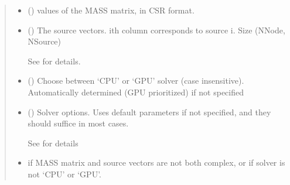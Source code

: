 \documentclass[letterpaper,10pt,english]{sphinxmanual}
\begin{document}
\begin{fulllineitems}
\begin{quote}
\begin{description}
\begin{itemize}
\item {} 
\sphinxAtStartPar
{} () \textendash{} values of the MASS matrix, in CSR format.

\item {} 
\sphinxAtStartPar
{} () \textendash{} 
\sphinxAtStartPar
The source vectors. i\sphinxhyphen{}th column corresponds to source i. Size (NNode, NSource)

\sphinxAtStartPar
See {\hyperref[\detokenize{_autosummary/nirfasterff.math.gen_sources:nirfasterff.math.gen_sources}]{}} for details.


\item {} 
\sphinxAtStartPar
{} (\sphinxstyleliteralemphasis{\sphinxupquote{, }}) \textendash{} Choose between ‘CPU’ or ‘GPU’ solver (case insensitive). Automatically determined (GPU prioritized) if not specified

\item {} 
\sphinxAtStartPar
{} ({\hyperref[\detokenize{_autosummary/nirfasterff.utils.SolverOptions:nirfasterff.utils.SolverOptions}]{}}\sphinxstyleliteralemphasis{\sphinxupquote{, }}) \textendash{} 
\sphinxAtStartPar
Solver options. Uses default parameters if not specified, and they should suffice in most cases.

\sphinxAtStartPar
See {\hyperref[\detokenize{_autosummary/nirfasterff.utils.SolverOptions:nirfasterff.utils.SolverOptions}]{}} for details


\end{itemize}

\begin{itemize}
\item {} 
\sphinxAtStartPar
{} \textendash{} if MASS matrix and source vectors are not both complex, or if solver is not ‘CPU’ or ‘GPU’.


\end{itemize}
\end{description}
\end{quote}
\end{fulllineitems}
\end{document}
